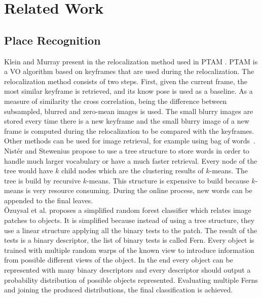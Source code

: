 

\section{Related Work}\label{sec:related_work}

\subsection{Place Recognition}
\label{ssub:place_recognition}


Klein and Murray present in \cite{Klein2008improving} the relocalization method used in PTAM \cite{KleinMurray2007}. PTAM is a VO algorithm based on keyframes that are used during the relocalization. The relocalization method consists of two steps. First, given the current frame, the most similar keyframe is retrieved, and its know pose is used as a baseline. As a measure of similarity the cross correlation, being the difference between subsampled, blurred and zero-mean images is used. The small blurry images are stored every time there is a new keyframe and the small blurry image of a new frame is computed during the relocalization to be compared with the keyframes.\\

Other methods can be used for image retrieval, for example using bag of words~\cite{Sivic2003}. Nist\'er and Stewenius \cite{Nister2006} propose to use a tree structure to store words in order to handle much larger vocabulary or have a much faster retrieval. Every node of the tree would have $k$ child nodes which are the clustering results of $k$-means. The tree is build by recursive $k$-means. This structure is expensive to build because $k$-means is very resource consuming. During the online process, new words can be appended to the final leaves.\\

\"Ozuysal et al. \cite{Ozuysal2010} proposes a simplified random forest classifier which relates image patches to objects. It is simplified because instead of using a tree structure, they use a linear structure applying all the binary tests to the patch. The result of the tests is a binary descriptor, the list of binary tests is called Fern. Every object is trained with multiple random warps of the known view to introduce information from possible different views of the object. In the end every object can be represented with many binary descriptors and every descriptor should output a probability distribution of possible objects represented. Evaluating multiple Ferns and joining the produced distributions, the final classification is achieved.\\

